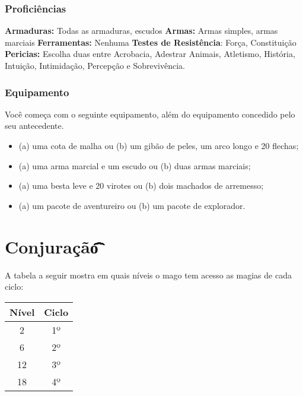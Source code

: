 \documentclass{RPG_Adventure}[2021/10/20]
\begin{document}
\subsubsection{Proficiências}%
\label{ssub:proficiencias}

\textbf{Armaduras:} Todas as armaduras, escudos \nl
\textbf{Armas:} Armas simples, armas marciais \nl
\textbf{Ferramentas:} Nenhuma \jump
\textbf{Testes de Resistência}: Força, Constituição \nl
\textbf{Pericias:} Escolha duas entre Acrobacia, Adestrar Animais, Atletismo,
História, Intuição, Intimidação, Percepção e Sobrevivência.

\subsubsection{Equipamento}%
\label{ssub:equipamento}

Você começa com o seguinte equipamento, além do equipamento concedido pelo seu
antecedente.
\begin{itemize}
    \item (a) uma cota de malha ou (b) um gibão de peles, um arco longo e 20
        flechas;
    \item (a) uma arma marcial e um escudo ou (b) duas armas marciais;
    \item (a) uma besta leve e 20 virotes ou (b) dois machados de arremesso;
    \item (a) um pacote de aventureiro ou (b) um pacote de explorador.
\end{itemize}

\section*{Conjuração\t\t\t\t\t\t\t\t\t\t\t}%
\label{sec:conjuracao}

A tabela a seguir mostra em quais níveis o mago tem acesso as magias de cada
ciclo:

\begin{center}
\begin{tabular}{|||c||c|||}
    \hline
    \textbf{Nível} & \textbf{Ciclo} \\
    \hline
    2 & 1º \\
    \hline
    6 & 2º \\
    \hline
    12 & 3º \\
    \hline
    18 & 4º \\
    \hline
\end{tabular}
\end{center}
\end{document}
